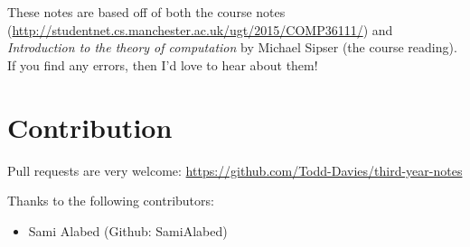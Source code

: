 These notes are based off of both the course notes
(\url{http://studentnet.cs.manchester.ac.uk/ugt/2015/COMP36111/}) and
\textit{Introduction to the theory of computation} by Michael Sipser (the course
reading). If you find any errors, then I'd love to hear about them!

\section*{Contribution}

Pull requests are very welcome:
\url{https://github.com/Todd-Davies/third-year-notes}

Thanks to the following contributors:
\begin{itemize}
\item{Sami Alabed (Github: SamiAlabed)}
\end{itemize}